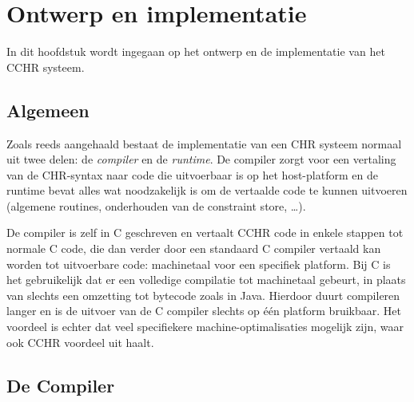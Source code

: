 \chapter{Ontwerp en implementatie} \label{chap:impl}

In dit hoofdstuk wordt ingegaan op het ontwerp en de implementatie van het CCHR systeem.

\section{Algemeen} \label{sec:impl}

Zoals reeds aangehaald bestaat de implementatie van een CHR systeem normaal uit twee delen: de {\em compiler} en de {\em runtime}. De compiler zorgt voor een vertaling van de CHR-syntax naar code die uitvoerbaar is op het host-platform en de runtime bevat alles wat noodzakelijk is om de vertaalde code te kunnen uitvoeren (algemene routines, onderhouden van de constraint store, \ldots).

De compiler is zelf in C geschreven en vertaalt CCHR code in enkele stappen tot normale C code, die dan verder door een standaard C compiler vertaald kan worden tot uitvoerbare code: machinetaal voor een specifiek platform. Bij C is het gebruikelijk dat er een volledige compilatie tot machinetaal gebeurt, in plaats van slechts een omzetting tot bytecode zoals in Java. Hierdoor duurt compileren langer en is de uitvoer van de C compiler slechts op \'e\'en platform bruikbaar. Het voordeel is echter dat veel specifiekere machine-optimalisaties mogelijk zijn, waar ook CCHR voordeel uit haalt.

\section{De Compiler} \label{sec:compiler}


